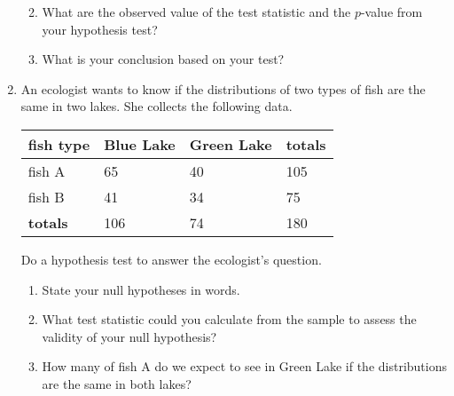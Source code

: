 \documentclass[12pt,fullpage]{amsart}
\begin{document}
\begin{enumerate}
\begin{enumerate}

\item What are the observed value of the test statistic and the $p$-value from your hypothesis test?


\item What is your conclusion based on your test?

  
  \end{enumerate}

\vfill

\item An ecologist wants to know if the distributions of two types of fish are the same in two lakes. She collects the following data.

\begin{center}
\begin{tabular}{llll}
\textbf{fish type} & \textbf{Blue Lake} & \textbf{Green Lake} & \textbf{totals}\\
\hline
fish A & 65 & 40 & 105\\
fish B & 41 & 34 & 75\\
\hline
\textbf{totals} & 106 & 74 & 180
\end{tabular}
\end{center}

Do a hypothesis test to answer the ecologist's question.
\begin{enumerate}
\item State your null hypotheses in words.

  
\item What test statistic could you calculate from the sample to assess the validity of your null hypothesis?

  
\item How many of fish A do we expect to see in Green Lake if the distributions are the same in both lakes?


\end{enumerate}
\end{enumerate}
\end{document}
